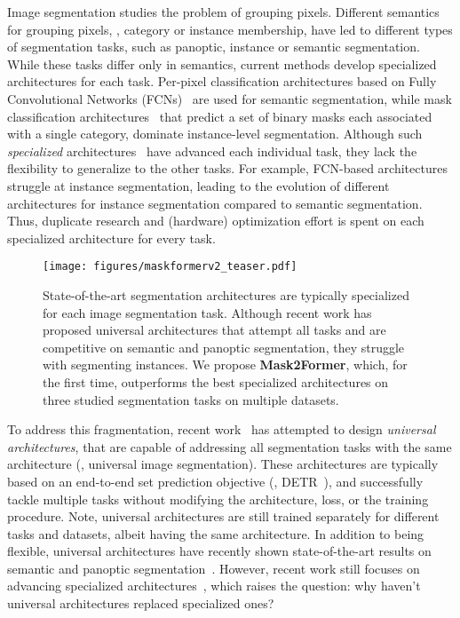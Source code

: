\documentclass[10pt,twocolumn,letterpaper]{article}
\newcommand{\modelname}{Mask2Former\xspace}
\newcommand{\sota}[0]{state-of-the-art\xspace}
\begin{document}
Image segmentation studies the problem of grouping  pixels.
Different semantics for grouping pixels, \eg, category or instance membership, have led to different types of segmentation tasks, such as panoptic, instance or semantic segmentation.
While these tasks differ only in semantics, current methods develop specialized architectures for each task.
Per-pixel classification architectures
based on Fully Convolutional Networks (FCNs)~\cite{long2015fully} are used for semantic segmentation, while mask classification architectures~\cite{he2017mask,detr} that predict a set of binary masks each associated with a single category,  dominate instance-level segmentation.
Although such \emph{specialized} architectures~\cite{long2015fully,deeplabV3plus,he2017mask,chen2019hybrid} have advanced each individual task, they lack the flexibility to generalize to the other tasks. For example, FCN-based architectures struggle at instance segmentation, leading to the evolution of different architectures for instance segmentation compared to semantic segmentation.
Thus, duplicate research and (hardware) optimization effort is spent on each specialized architecture for every task.

\begin{figure}[t!]
    \centering
    \texttt{[image: figures/maskformerv2\_teaser.pdf]}
    \caption{
        State-of-the-art segmentation architectures are typically specialized for each image segmentation task.
        Although recent work has proposed universal architectures that attempt all tasks and are competitive on semantic and panoptic segmentation, they struggle with segmenting instances. We propose \textbf{\modelname}, which, for the first time, outperforms the best specialized architectures on three studied segmentation tasks on multiple datasets.
        }
    \label{fig:teaser}
    \vspace{-1mm}
\end{figure}

To address this fragmentation, recent work~\cite{cheng2021maskformer,zhang2021knet} has attempted to design \emph{universal architectures}, that are capable of addressing all segmentation tasks with the same architecture (\ie, universal image segmentation).
These architectures are typically based on an end-to-end set prediction objective (\eg, DETR~\cite{detr}), and successfully tackle multiple tasks without modifying the architecture, loss, or the training procedure. 
Note, universal architectures are still trained separately for different tasks and datasets, albeit having the same architecture. In addition to being flexible, universal architectures have recently shown \sota
results on semantic and panoptic segmentation~\cite{cheng2021maskformer}.
However, recent work  still focuses on advancing specialized architectures~\cite{fapn,strudel2021segmenter,QueryInst}, which raises the question: why haven't universal architectures replaced specialized ones?
\end{document}
